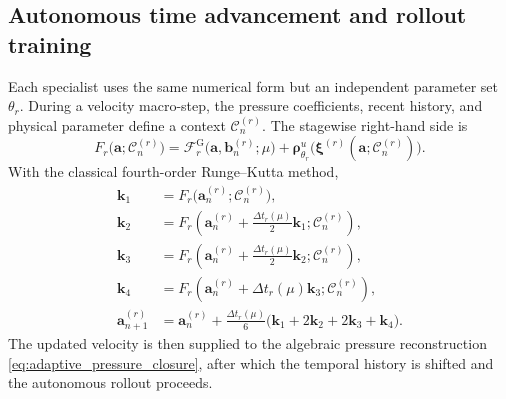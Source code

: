 \subsection{Autonomous time advancement and rollout training}
\label{subsec:regime_specific_contracts}

Each specialist uses the same numerical form but an independent parameter set
$\theta_r$.  During a velocity macro-step, the pressure coefficients, recent
history, and physical parameter define a context $\mathcal{C}^{(r)}_n$.  The
stagewise right-hand side is
\begin{equation}
  F_r
  \bigl(\boldsymbol{a};\mathcal{C}^{(r)}_n\bigr)
  =
  \mathscr{F}^{\mathrm{G}}_r
  \bigl(\boldsymbol{a},\boldsymbol{b}^{(r)}_n;\mu\bigr)
  +
  \boldsymbol{\rho}^{u}_{\theta_r}
  \bigl(
    \boldsymbol{\xi}^{(r)}(\boldsymbol{a};\mathcal{C}^{(r)}_n)
  \bigr).
  \label{eq:frozen_context_rhs}
\end{equation}
With the classical fourth-order Runge--Kutta method,
\begin{align}
  \boldsymbol{k}_1
  &=F_r\bigl(\boldsymbol{a}^{(r)}_n;\mathcal{C}^{(r)}_n\bigr),\nonumber\\
  \boldsymbol{k}_2
  &=F_r\left(
      \boldsymbol{a}^{(r)}_n
      +\tfrac{\Delta t_r(\mu)}{2}\boldsymbol{k}_1;
      \mathcal{C}^{(r)}_n
    \right),\nonumber\\
  \boldsymbol{k}_3
  &=F_r\left(
      \boldsymbol{a}^{(r)}_n
      +\tfrac{\Delta t_r(\mu)}{2}\boldsymbol{k}_2;
      \mathcal{C}^{(r)}_n
    \right),\nonumber\\
  \boldsymbol{k}_4
  &=F_r\left(
      \boldsymbol{a}^{(r)}_n
      +\Delta t_r(\mu)\boldsymbol{k}_3;
      \mathcal{C}^{(r)}_n
    \right),\nonumber\\
  \boldsymbol{a}^{(r)}_{n+1}
  &=
  \boldsymbol{a}^{(r)}_n
  +\frac{\Delta t_r(\mu)}{6}
   \bigl(
     \boldsymbol{k}_1+2\boldsymbol{k}_2
     +2\boldsymbol{k}_3+\boldsymbol{k}_4
   \bigr).
  \label{eq:unified_rk4}
\end{align}
The updated velocity is then supplied to the algebraic pressure reconstruction
\eqref{eq:adaptive_pressure_closure}, after which the temporal history is
shifted and the autonomous rollout proceeds.

